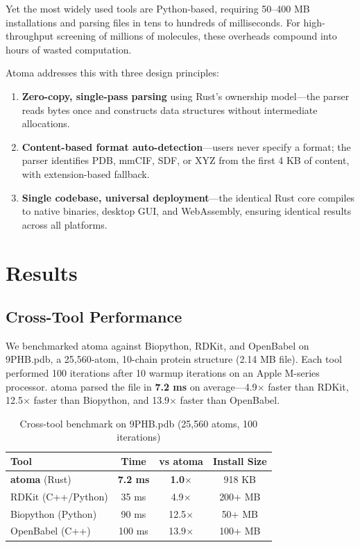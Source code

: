 \documentclass[11pt,a4paper]{article}
\begin{document}
Yet the most widely used tools are Python-based, requiring 50--400 MB installations and parsing files in tens to hundreds of milliseconds. For high-throughput screening of millions of molecules, these overheads compound into hours of wasted computation.

Atoma addresses this with three design principles:

\begin{enumerate}[leftmargin=*]
  \item \textbf{Zero-copy, single-pass parsing} using Rust's ownership model---the parser reads bytes once and constructs data structures without intermediate allocations.
  \item \textbf{Content-based format auto-detection}---users never specify a format; the parser identifies PDB, mmCIF, SDF, or XYZ from the first 4 KB of content, with extension-based fallback.
  \item \textbf{Single codebase, universal deployment}---the identical Rust core compiles to native binaries, desktop GUI, and WebAssembly, ensuring identical results across all platforms.
\end{enumerate}

\section{Results}

\subsection{Cross-Tool Performance}

We benchmarked atoma against Biopython, RDKit, and OpenBabel on 9PHB.pdb, a 25,560-atom, 10-chain protein structure (2.14 MB file). Each tool performed 100 iterations after 10 warmup iterations on an Apple M-series processor. atoma parsed the file in \textbf{7.2 ms} on average---4.9$\times$ faster than RDKit, 12.5$\times$ faster than Biopython, and 13.9$\times$ faster than OpenBabel.

\begin{table}[h]
\centering
\caption{Cross-tool benchmark on 9PHB.pdb (25,560 atoms, 100 iterations)}
\begin{tabular}{lccc}
\toprule
\textbf{Tool} & \textbf{Time} & \textbf{vs atoma} & \textbf{Install Size} \\
\midrule
\textbf{atoma} (Rust)    & \textbf{7.2 ms}  & \textbf{1.0}$\times$ & 918 KB \\
RDKit (C++/Python)       & 35 ms   & 4.9$\times$ & 200+ MB \\
Biopython (Python)       & 90 ms   & 12.5$\times$ & 50+ MB \\
OpenBabel (C++)          & 100 ms  & 13.9$\times$ & 100+ MB \\
\bottomrule
\end{tabular}
\end{table}
\end{document}
